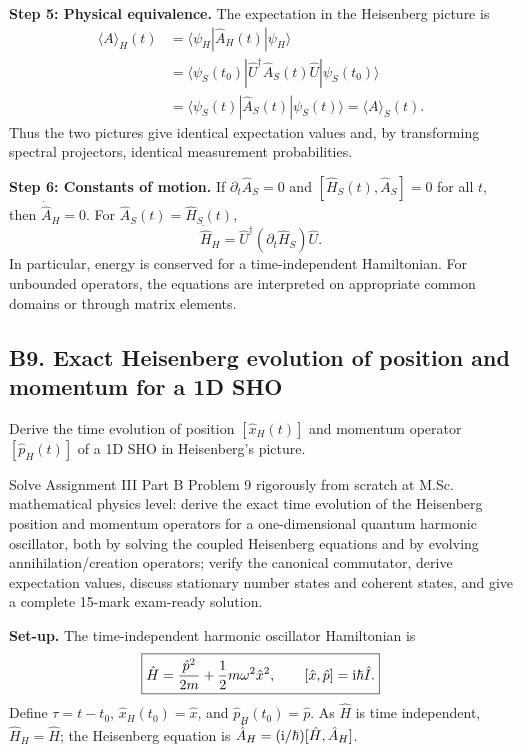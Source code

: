 \documentclass[11pt,a4paper]{article}
\newcommand{\avg}[1]{\langle #1\rangle}\newcommand{\Sch}{Schr\"odinger}
\newcommand{\bra}[1]{\langle #1|}\newcommand{\ket}[1]{|#1\rangle}
\begin{document}
\textbf{Step 5: Physical equivalence.} The expectation in the Heisenberg picture is
\begin{align}
\avg A_H(t)&=\bra{\psi_H}\hat A_H(t)\ket{\psi_H}\\
&=\bra{\psi_S(t_0)}\hat U^\dagger\hat A_S(t)\hat U\ket{\psi_S(t_0)}\\
&=\bra{\psi_S(t)}\hat A_S(t)\ket{\psi_S(t)}=\avg A_S(t).
\end{align}
Thus the two pictures give identical expectation values and, by transforming spectral projectors, identical measurement probabilities.

\textbf{Step 6: Constants of motion.} If \(\partial_t\hat A_S=0\) and \([\hat H_S(t),\hat A_S]=0\) for all \(t\), then \(\dot{\hat A}_H=0\). For \(\hat A_S(t)=\hat H_S(t)\),
\begin{equation}\boxed{\dot{\hat H}_H=\hat U^\dagger(\partial_t\hat H_S)\hat U.}\end{equation}
In particular, energy is conserved for a time-independent Hamiltonian. For unbounded operators, the equations are interpreted on appropriate common domains or through matrix elements.

\subsection{B9. Exact Heisenberg evolution of position and momentum for a 1D SHO}
\begin{questionbox}
Derive the time evolution of position \([\hat x_H(t)]\) and momentum operator \([\hat p_H(t)]\) of a 1D SHO in Heisenberg's picture.
\end{questionbox}
\begin{studybox}
Solve Assignment III Part B Problem 9 rigorously from scratch at M.Sc. mathematical physics level: derive the exact time evolution of the Heisenberg position and momentum operators for a one-dimensional quantum harmonic oscillator, both by solving the coupled Heisenberg equations and by evolving annihilation/creation operators; verify the canonical commutator, derive expectation values, discuss stationary number states and coherent states, and give a complete 15-mark exam-ready solution.
\end{studybox}
\textbf{Set-up.} The time-independent harmonic oscillator Hamiltonian is
\begin{equation}\boxed{\hat H=\frac{\hat p^2}{2m}+\frac12m\omega^2\hat x^2,\qquad[\hat x,\hat p]=\mathrm{i}\hbar\hat I.}\end{equation}
Define \(\tau=t-t_0\), \(\hat x_H(t_0)=\hat x\), and \(\hat p_H(t_0)=\hat p\). As \(\hat H\) is time independent, \(\hat H_H=\hat H\); the Heisenberg equation is \(\dot{\hat A}_H=(\mathrm{i}/\hbar)[\hat H,\hat A_H]\).
\end{document}
